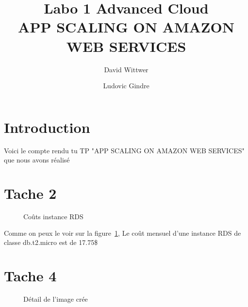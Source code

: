 \documentclass[french,a4paper,11pt]{article}
\title{Labo 1 Advanced Cloud\\APP SCALING ON AMAZON WEB SERVICES}
\author{David Wittwer \and Ludovic Gindre}
\begin{document}
    \maketitle
    \section{Introduction}\label{sec:introduction}
    Voici le compte rendu tu TP "APP SCALING ON AMAZON WEB SERVICES" que nous avons réalisé

    \section{Tache 2}\label{sec:task-2}

    \begin{figure}
        \caption{\label{rds-costs}Coûts instance RDS}
    \end{figure}
    Comme on peux le voir sur la figure~\ref{rds-costs}, Le coût mensuel d'une instance RDS de classe db.t2.micro est de 17.75\$

    \section{Tache 4}\label{sec:task-4}

    \begin{figure}
        \caption{\label{ami-details}Détail de l'image crée}
    \end{figure}
\end{document}
